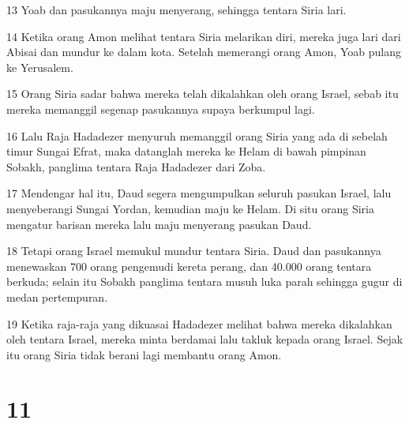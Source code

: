 \par 13 Yoab dan pasukannya maju menyerang, sehingga tentara Siria lari.
\par 14 Ketika orang Amon melihat tentara Siria melarikan diri, mereka juga lari dari Abisai dan mundur ke dalam kota. Setelah memerangi orang Amon, Yoab pulang ke Yerusalem.
\par 15 Orang Siria sadar bahwa mereka telah dikalahkan oleh orang Israel, sebab itu mereka memanggil segenap pasukannya supaya berkumpul lagi.
\par 16 Lalu Raja Hadadezer menyuruh memanggil orang Siria yang ada di sebelah timur Sungai Efrat, maka datanglah mereka ke Helam di bawah pimpinan Sobakh, panglima tentara Raja Hadadezer dari Zoba.
\par 17 Mendengar hal itu, Daud segera mengumpulkan seluruh pasukan Israel, lalu menyeberangi Sungai Yordan, kemudian maju ke Helam. Di situ orang Siria mengatur barisan mereka lalu maju menyerang pasukan Daud.
\par 18 Tetapi orang Israel memukul mundur tentara Siria. Daud dan pasukannya menewaskan 700 orang pengemudi kereta perang, dan 40.000 orang tentara berkuda; selain itu Sobakh panglima tentara musuh luka parah sehingga gugur di medan pertempuran.
\par 19 Ketika raja-raja yang dikuasai Hadadezer melihat bahwa mereka dikalahkan oleh tentara Israel, mereka minta berdamai lalu takluk kepada orang Israel. Sejak itu orang Siria tidak berani lagi membantu orang Amon.

\chapter{11}

